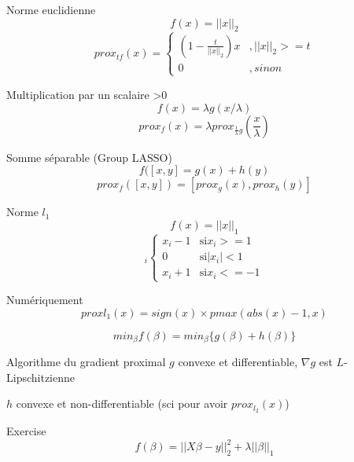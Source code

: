 \documentclass{article}
\begin{document}
Norme euclidienne
\begin{equation}
f(x)=||x||_2
\end{equation}
\begin{equation}
prox_{tf}(x)=\left\{\begin{array}{rcl}
(1-\frac{t}{||x||_2})x&, ||x||_2>=t\\
0&, sinon
\end{array}\right.
\end{equation}

Multiplication par un scalaire >0
\begin{equation}
f(x)=\lambda g(x/\lambda)
\end{equation}
\begin{equation}
prox_f(x)=\lambda prox_{\frac{1}{\lambda}g}(\frac{x}{\lambda})
\end{equation}

Somme s\'eparable (Group LASSO)
\begin{equation}
f([x,y]=g(x)+h(y)
\end{equation}
\begin{equation}
prox_f([x,y])=[prox_g(x), prox_h(y)]
\end{equation}

Norme $l_1$
\begin{equation}
f(x)=||x||_1
\end{equation}
\begin{equation}
[prox_f(x)]_i\left\{\begin{array}{rcl}
x_i-1 & \text{si} x_i>=1\\
0 & \text{si} |x_i|<1\\
x_i+1 & \text{si} x_i<=-1
\end{array}\right.
\end{equation}

Num\'eriquement
\begin{equation}
prox l_1(x)=sign(x)\times pmax(abs(x)-1,x)
\end{equation}

\begin{equation}
min_\beta f(\beta)=min_\beta \{g(\beta)+h(\beta)\}
\end{equation}

Algorithme du gradient proximal
$g$ convexe et differentiable, $\nabla g$ est $L$-Lipschitzienne

$h$ convexe et non-differentiable (sci pour avoir $prox_{l_2}(x)$)

Exercise
\begin{equation}
f(\beta)=||X\beta-y||_2^2+\lambda ||\beta||_1
\end{equation}
\end{document}
